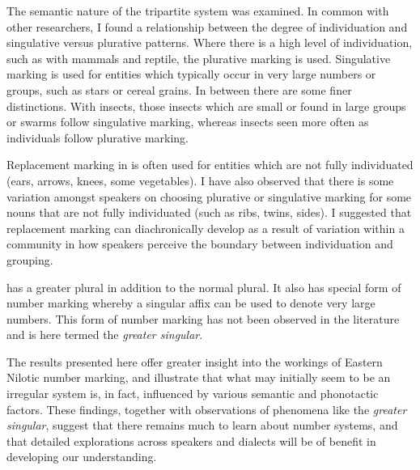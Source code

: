 \documentclass[output=paper]{langsci/langscibook}
\begin{document}
The semantic nature of the tripartite system was examined. In common with other researchers, I found a relationship between the degree of individuation and singulative versus plurative patterns. Where there is a high level of individuation, such as with mammals and reptile, the plurative marking is used. Singulative marking is used for entities which typically occur in very large numbers or groups, such as stars or cereal grains. In between there are some finer distinctions. With insects, those insects which are small or found in large groups or swarms follow singulative marking, whereas insects seen more often as individuals follow plurative marking.

Replacement marking in  is often used for entities which are not fully individuated (ears, arrows, knees, some vegetables). I have also observed that there is some variation amongst speakers on choosing plurative or singulative marking for some nouns that are not fully individuated (such as ribs, twins, sides). I suggested that replacement marking can diachronically develop as a result of variation within a community in how speakers perceive the boundary between individuation and grouping.

 has a greater plural in addition to the normal plural. It also has special form of number marking whereby a singular affix can be used to denote very large numbers. This form of number marking has not been observed in the literature and is here termed the \textit{greater singular}.

The results presented here offer greater insight into the workings of Eastern Nilotic number marking, and illustrate that what may initially seem to be an irregular system is, in fact, influenced by various semantic and phonotactic factors. These findings, together with observations of phenomena like the \textit{greater singular}, suggest that there remains much to learn about  number systems, and that detailed explorations across speakers and dialects will be of benefit in developing our understanding. 
\end{document}
